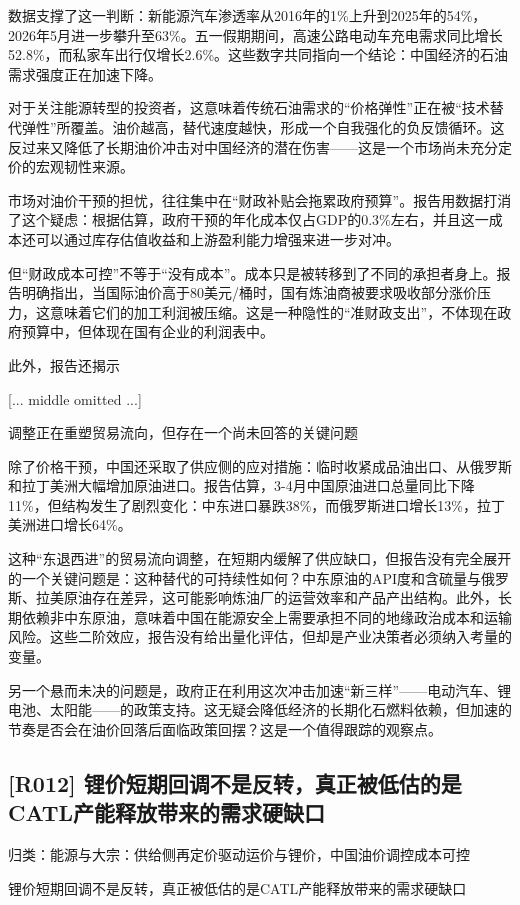 \documentclass[11pt]{ctexart}
\begin{document}
数据支撑了这一判断：新能源汽车渗透率从2016年的1\%上升到2025年的54\%，2026年5月进一步攀升至63\%。五一假期期间，高速公路电动车充电需求同比增长52.8\%，而私家车出行仅增长2.6\%。这些数字共同指向一个结论：中国经济的石油需求强度正在加速下降。

对于关注能源转型的投资者，这意味着传统石油需求的“价格弹性”正在被“技术替代弹性”所覆盖。油价越高，替代速度越快，形成一个自我强化的负反馈循环。这反过来又降低了长期油价冲击对中国经济的潜在伤害——这是一个市场尚未充分定价的宏观韧性来源。

市场对油价干预的担忧，往往集中在“财政补贴会拖累政府预算”。报告用数据打消了这个疑虑：根据估算，政府干预的年化成本仅占GDP的0.3\%左右，并且这一成本还可以通过库存估值收益和上游盈利能力增强来进一步对冲。

但“财政成本可控”不等于“没有成本”。成本只是被转移到了不同的承担者身上。报告明确指出，当国际油价高于80美元/桶时，国有炼油商被要求吸收部分涨价压力，这意味着它们的加工利润被压缩。这是一种隐性的“准财政支出”，不体现在政府预算中，但体现在国有企业的利润表中。

此外，报告还揭示

[... middle omitted ...]

调整正在重塑贸易流向，但存在一个尚未回答的关键问题

除了价格干预，中国还采取了供应侧的应对措施：临时收紧成品油出口、从俄罗斯和拉丁美洲大幅增加原油进口。报告估算，3-4月中国原油进口总量同比下降11\%，但结构发生了剧烈变化：中东进口暴跌38\%，而俄罗斯进口增长13\%，拉丁美洲进口增长64\%。

这种“东退西进”的贸易流向调整，在短期内缓解了供应缺口，但报告没有完全展开的一个关键问题是：这种替代的可持续性如何？中东原油的API度和含硫量与俄罗斯、拉美原油存在差异，这可能影响炼油厂的运营效率和产品产出结构。此外，长期依赖非中东原油，意味着中国在能源安全上需要承担不同的地缘政治成本和运输风险。这些二阶效应，报告没有给出量化评估，但却是产业决策者必须纳入考量的变量。

另一个悬而未决的问题是，政府正在利用这次冲击加速“新三样”——电动汽车、锂电池、太阳能——的政策支持。这无疑会降低经济的长期化石燃料依赖，但加速的节奏是否会在油价回落后面临政策回摆？这是一个值得跟踪的观察点。

\subsection{[R012] 锂价短期回调不是反转，真正被低估的是CATL产能释放带来的需求硬缺口}
{\small\color{refgray}归类：能源与大宗：供给侧再定价驱动运价与锂价，中国油价调控成本可控}

锂价短期回调不是反转，真正被低估的是CATL产能释放带来的需求硬缺口
\end{document}
